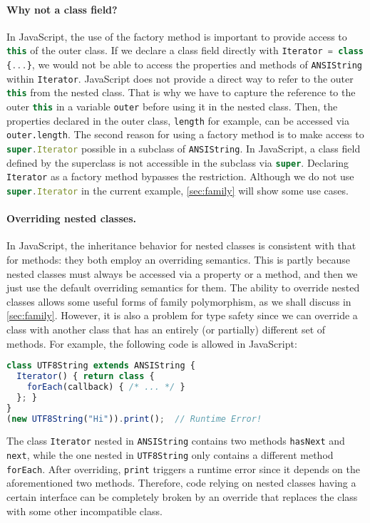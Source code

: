 \paragraph{Why not a class field?}
In JavaScript, the use of the factory method is important to provide access to
\lstinline[language=TypeScript]{this} of the outer class. If we declare a class
field directly with \lstinline[language=TypeScript]|Iterator = class {...}|, we
would not be able to access the properties and methods of \lstinline{ANSIString}
within \lstinline{Iterator}. JavaScript does not provide a direct way to refer
to the outer \lstinline[language=TypeScript]{this} from the nested class. That
is why we have to capture the reference to the outer
\lstinline[language=TypeScript]{this} in a variable \lstinline{outer} before
using it in the nested class. Then, the properties declared in the outer class,
\lstinline{length} for example, can be accessed via \lstinline{outer.length}.
The second reason for using a factory method is to make access to
\lstinline[language=TypeScript]{super.Iterator} possible in a subclass of
\lstinline{ANSIString}. In JavaScript, a class field defined by the superclass
is not accessible in the subclass via \lstinline[language=TypeScript]{super}.
Declaring \lstinline{Iterator} as a factory method bypasses the restriction.
Although we do not use \lstinline[language=TypeScript]{super.Iterator} in the
current example, \autoref{sec:family} will show some use cases.

\paragraph{Overriding nested classes.}
In JavaScript, the inheritance behavior for nested classes is consistent with
that for methods: they both employ an overriding semantics. This is partly
because nested classes must always be accessed via a property or a method, and
then we just use the default overriding semantics for them. The ability to
override nested classes allows some useful forms of family polymorphism, as we
shall discuss in \autoref{sec:family}. However, it is also a problem for type
safety since we can override a class with another class that has an entirely (or
partially) different set of methods. For example, the following code is allowed
in JavaScript:
\begin{lstlisting}[language=TypeScript]
class UTF8String extends ANSIString {
  Iterator() { return class {
    forEach(callback) { /* ... */ }
  }; }
}
(new UTF8String("Hi")).print();  // Runtime Error!
\end{lstlisting}
The class \lstinline{Iterator} nested in \lstinline{ANSIString} contains two
methods \lstinline{hasNext} and \lstinline{next}, while the one nested in
\lstinline{UTF8String} only contains a different method \lstinline{forEach}.
After overriding, \lstinline{print} triggers a runtime error since it depends on
the aforementioned two methods. Therefore, code relying on nested classes having
a certain interface can be completely broken by an override that replaces the
class with some other incompatible class.

